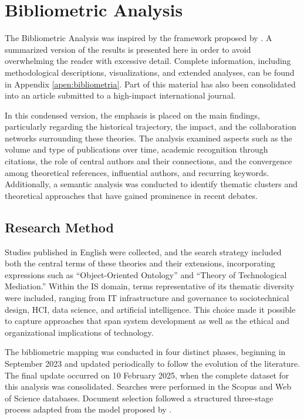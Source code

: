 \section{Bibliometric Analysis}

The Bibliometric Analysis was inspired by the framework proposed by . A summarized version of the results is presented here in order to avoid overwhelming the reader with excessive detail. Complete information, including methodological descriptions, visualizations, and extended analyses, can be found in Appendix \ref{apen:bibliometria}. Part of this material has also been consolidated into an article submitted to a high-impact international journal.

In this condensed version, the emphasis is placed on the main findings, particularly regarding the historical trajectory, the impact, and the collaboration networks surrounding these theories. The analysis examined aspects such as the volume and type of publications over time, academic recognition through citations, the role of central authors and their connections, and the convergence among theoretical references, influential authors, and recurring keywords. Additionally, a semantic analysis was conducted to identify thematic clusters and theoretical approaches that have gained prominence in recent debates.

\subsection{Research Method}

Studies published in English were collected, and the search strategy included both the central terms of these theories and their extensions, incorporating expressions such as ``Object-Oriented Ontology'' and ``Theory of Technological Mediation.'' Within the IS domain, terms representative of its thematic diversity were included, ranging from IT infrastructure and governance to sociotechnical design, HCI, data science, and artificial intelligence. This choice made it possible to capture approaches that span system development as well as the ethical and organizational implications of technology.

The bibliometric mapping was conducted in four distinct phases, beginning in September 2023 and updated periodically to follow the evolution of the literature. The final update occurred on 10 February 2025, when the complete dataset for this analysis was consolidated. Searches were performed in the Scopus and Web of Science databases. Document selection followed a structured three-stage process adapted from the model proposed by .

